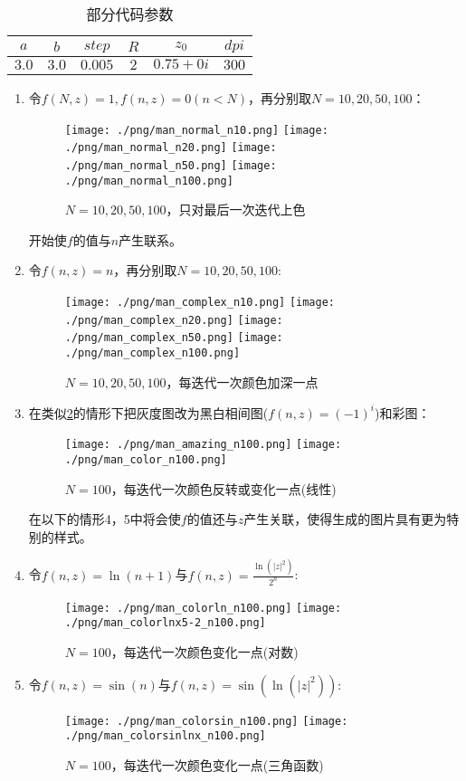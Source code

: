 \documentclass[a4paper]{ctexart}
\begin{document}
\begin{table}[htbp]
\caption{部分代码参数}
\centering
\begin{tabular}{|c|c|c|c|c|c|}
	\hline
	$a$ & $b$ & $step$ & $R$ & $z_0$ & $dpi$ \\
	\hline
	$3.0$ & $3.0$ & $0.005$ & $2$ & $0.75+0i$ & $300$ \\
	\hline 
\end{tabular}
\end{table}
\begin{enumerate}
	\item 令$f(N,z)=1,f(n,z)=0(n<N)$，再分别取$N=10,20,50,100$：
	\begin{figure}[htbp]
		\centering
		\texttt{[image: ./png/man\_normal\_n10.png]}
		\texttt{[image: ./png/man\_normal\_n20.png]}
		\texttt{[image: ./png/man\_normal\_n50.png]}
		\texttt{[image: ./png/man\_normal\_n100.png]}
		\caption{$N=10,20,50,100$，只对最后一次迭代上色}
		\label{normal}
	\end{figure}

开始使$f$的值与$n$产生联系。
\item 令$f(n,z)=n$，再分别取$N=10,20,50,100$:
\begin{figure}[H]
	\centering
	\texttt{[image: ./png/man\_complex\_n10.png]}
	\texttt{[image: ./png/man\_complex\_n20.png]}
	\texttt{[image: ./png/man\_complex\_n50.png]}
	\texttt{[image: ./png/man\_complex\_n100.png]}
	\caption{$N=10,20,50,100$，每迭代一次颜色加深一点}
	\label{complex}
\end{figure}
\item 在类似\ref{complex}的情形下把灰度图改为黑白相间图($f(n,z)=(-1)^i$)和彩图：
\begin{figure}[H]
	\centering
	\texttt{[image: ./png/man\_amazing\_n100.png]}
	\texttt{[image: ./png/man\_color\_n100.png]}
	\caption{$N=100$，每迭代一次颜色反转或变化一点(线性)}
	\label{color}
\end{figure}

在以下的情形4，5中将会使$f$的值还与$z$产生关联，使得生成的图片具有更为特别的样式。
\item 令$f(n,z)=\ln(n+1)$与$\displaystyle f(n,z)=\frac{\ln(|z|^2)}{2^n}$:
\begin{figure}[H]
	\centering
	\texttt{[image: ./png/man\_colorln\_n100.png]}
	\texttt{[image: ./png/man\_colorlnx5-2\_n100.png]}
	\caption{$N=100$，每迭代一次颜色变化一点(对数)}
	\label{colorln}
\end{figure}
\item 令$f(n,z)=\sin(n)$与$\displaystyle f(n,z)=\sin(\ln(|z|^2))$:
\begin{figure}[H]
	\centering
	\texttt{[image: ./png/man\_colorsin\_n100.png]}
	\texttt{[image: ./png/man\_colorsinlnx\_n100.png]}
	\caption{$N=100$，每迭代一次颜色变化一点(三角函数)}
	\label{colorsin}
\end{figure}
\end{enumerate}
\end{document}
